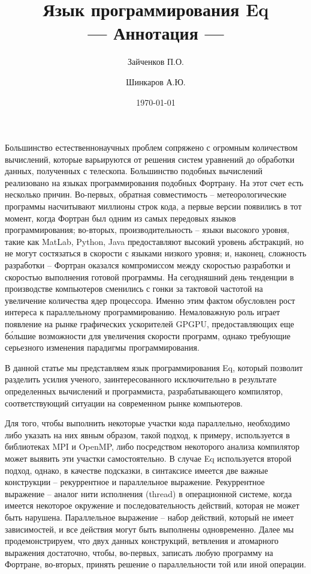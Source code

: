 \documentclass[a4paper]{llncs}
\author{Зайченков П.О.\inst{1} \and Шинкаров А.Ю.\inst{2}}
\date{\today}
\title{Язык программирования Eq \\
      --- Аннотация ---}
\institute{
  Московский физико-технический институт,
  Кафедра информатики и вычислительной техники
\and
  University of Hertfordshire,
  Hatfield, Hertfordshire,
  AL10 9AB, United Kingdom
}
\begin{document}
\maketitle

Большинство естественнонаучных проблем сопряжено с
огромным количеством вычислений, которые варьируются от решения систем 
уравнений до обработки данных, полученных с 
телескопа.  Большинство подобных 
вычислений реализовано на языках программирования подобных Фортрану. На этот счет есть несколько причин.
Во-первых, обратная совместимость -- метеорологические программы насчитывают 
миллионы строк кода, а первые версии появились в тот момент, когда Фортран был одним из самых
передовых языков программирования; во-вторых, производительность --
языки высокого уровня, такие как MatLab, Python, Java предоставляют
высокий уровень абстракций, но не могут состязаться в скорости с
языками низкого уровня; и, наконец, сложность разработки -- Фортран
оказался компромиссом между скоростью разработки и скоростью
выполнения готовой программы. На сегодняшний день тенденции в производстве компьютеров сменились с 
гонки за тактовой частотой на увеличение количества ядер процессора.  
Именно этим фактом обусловлен рост интереса к параллельному программированию.  
Немаловажную роль играет появление на рынке графических ускорителей GPGPU,
предоставляющих еще б\'{о}льшие возможности для увеличения скорости
программ, однако требующие серьезного изменения парадигмы
программирования.

В данной статье мы представляем язык программирования Eq, который
позволит разделить усилия ученого, заинтересованного исключительно в
результате определенных вычислений и программиста, разрабатывающего
компилятор, соответствующий ситуации на современном рынке компьютеров.

Для того, чтобы выполнить некоторые участки кода параллельно, необходимо 
либо указать на них явным образом, такой подход, к примеру, используется в 
библиотеках MPI и OpenMP, либо посредством некоторого анализа компилятор может 
выявить эти участки самостоятельно.  В случае Eq используется второй подход, 
однако, в качестве подсказки, в синтаксисе имеется две важные конструкции --
рекуррентное и параллельное выражение.  Рекуррентное выражение -- аналог нити 
исполнения (thread) в операционной системе, когда имеется некоторое окружение 
и последовательность действий, которая не может быть нарушена.  Параллельное 
выражение -- набор действий, который не имеет  зависимостей, и все действия 
могут быть выполнены одновременно.  Далее мы продемонстрируем, что двух данных 
конструкций, ветвления и атомарного выражения достаточно, чтобы, во-первых, 
записать любую программу на Фортране, во-вторых, принять решение о 
параллельности той или иной операции.
\end{document}

